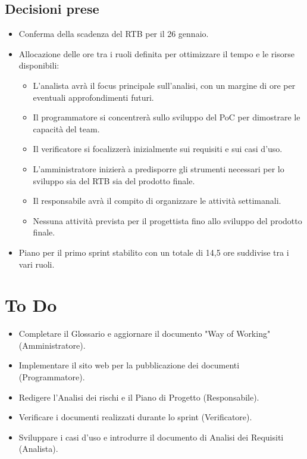 \documentclass[a4paper, 12pt]{article}
\begin{document}
\subsection{Decisioni prese}
\begin{itemize}
    \item Conferma della scadenza del RTB per il 26 gennaio.
    \item Allocazione delle ore tra i ruoli definita per ottimizzare il tempo e le risorse disponibili:
    \begin{itemize}
        \item L'analista avrà il focus principale sull'analisi, con un margine di ore per eventuali approfondimenti futuri.
        \item Il programmatore si concentrerà sullo sviluppo del PoC per dimostrare le capacità del team.
        \item Il verificatore si focalizzerà inizialmente sui requisiti e sui casi d'uso.
        \item L'amministratore inizierà a predisporre gli strumenti necessari per lo sviluppo sia del RTB sia del prodotto finale.
        \item Il responsabile avrà il compito di organizzare le attività settimanali.
        \item Nessuna attività prevista per il progettista fino allo sviluppo del prodotto finale.
    \end{itemize}
    \item Piano per il primo sprint stabilito con un totale di 14,5 ore suddivise tra i vari ruoli.
\end{itemize}

\section{To Do}
\begin{itemize}
    \item Completare il Glossario e aggiornare il documento "Way of Working" (Amministratore).
    \item Implementare il sito web per la pubblicazione dei documenti (Programmatore).
    \item Redigere l'Analisi dei rischi e il Piano di Progetto (Responsabile).
    \item Verificare i documenti realizzati durante lo sprint (Verificatore).
    \item Sviluppare i casi d'uso e introdurre il documento di Analisi dei Requisiti (Analista).
\end{itemize}
\end{document}
